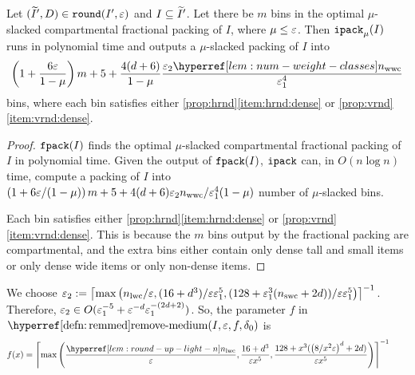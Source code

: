 \begin{theorem}
\label{thm:ipack}
Let $(\widetilde{I}', D) \in \operatorname{\mathtt{round}}(I', \varepsilon)$ and $I \subseteq \widetilde{I}'$.
Let there be $m$ bins in the optimal $\mu$-slacked compartmental fractional packing of $I$,
where $\mu \le \varepsilon$. Then $\operatorname{\mathtt{ipack}}_{\mu}(I)$ runs in polynomial time and outputs
a $\mu$-slacked packing of $I$ into
\[ \left( 1 + \frac{6\eps}{1-\mu}\right)m + 5
    + \frac{4(d+6)}{1-\mu} \frac{\epsSmall\nwwcHyp}{\epsLarge^4} \]
bins, where each bin satisfies either \cref{prop:hrnd}\ref{item:hrnd:dense}
or \cref{prop:vrnd}\ref{item:vrnd:dense}.
\end{theorem}
\begin{proof}
$\operatorname{\mathtt{fpack}}(I)$ finds the optimal $\mu$-slacked compartmental fractional packing
of $I$ in polynomial time. Given the output of $\operatorname{\mathtt{fpack}}(I)$, $\operatorname{\mathtt{ipack}}$ can, in $O(n\log n)$ time,
compute a packing of $I$ into
$\left( 1 + 6\varepsilon/(1-\mu)\right)m + 5
+ 4(d+6)\varepsilon_2 n_{\mathrm{wwc}}/\varepsilon_1^4(1-\mu)$ number of $\mu$-slacked bins.

Each bin satisfies either \cref{prop:hrnd}\ref{item:hrnd:dense}
or \cref{prop:vrnd}\ref{item:vrnd:dense}.
This is because the $m$ bins output by the fractional packing are compartmental,
and the extra bins either contain only dense tall and small items or
only dense wide items or only non-dense items.
\end{proof}

We choose
$\varepsilon_2 := \left\lceil \max\left(n_{\mathrm{lwc}}/\varepsilon, (16 + d^3)/\varepsilon\varepsilon_1^5,
    (128 + \varepsilon_1^3(n_{\mathrm{swc}} + 2d))/\varepsilon\varepsilon_1^5\right) \right\rceil^{-1}$.
Therefore,
$\varepsilon_2 \in O(\varepsilon_1^{-5} + \varepsilon^{-d}\varepsilon_1^{-(2d+2)})$.
So, the parameter $f$ in $\remMedHyp(I, \eps, f, \delta_0)$ is
\begin{equation} \label{eqn:remmed-f} f(x) = \ceil{\max\left(
    \frac{\nlwcHyp}{\eps}, \frac{16 + d^3}{\eps x^5},
    \frac{128 + x^3(\left(8/x^2\eps\right)^d + 2d)}{\eps x^5}\right)}^{-1}
    \tag*{}
\end{equation}


